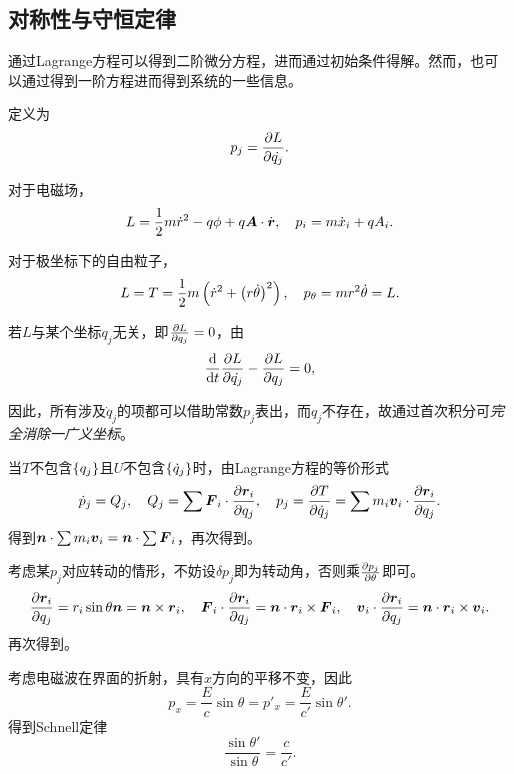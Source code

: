 \documentclass{ctexrep}
\begin{document}
\subsection{对称性与守恒定律}
通过Lagrange方程可以得到二阶微分方程，进而通过初始条件得解。然而，也可以通过得到一阶方程进而得到系统的一些信息。
\par
定义为
\[ p_j = \frac{\partial L}{\partial \dot{q_j}}. \]
\begin{ex}
  对于电磁场，
  \[ L = \frac{1}{2} m\dot{r}^2 - q\phi +q\boldsymbol{A}\cdot\dot{\boldsymbol{r}}, \quad p_i = m \dot{x}_i + q A_i. \]
\end{ex}
\begin{ex}
  对于极坐标下的自由粒子，
  \[ L = T = \frac{1}{2} m \left(\dot{r}^2 + \left(r\dot{\theta}\right)^2\right), \quad p_\theta = mr^2\dot{\theta} = L. \]
\end{ex}
若$L$与某个坐标$q_j$无关，即$\frac{\partial L}{\partial q_j}=0$，由
\[ \frac{\mathrm{d}}{\mathrm{d} t}\frac{\partial L}{\partial \dot{q_j}} - \frac{\partial L}{\partial q_j} = 0, \]
\par
因此，所有涉及$\dot{q}_j$的项都可以借助常数$p_j$表出，而$q_j$不存在，故通过首次积分可\emph{完全消除一广义坐标}。
\par
当$T$不包含$\left\{q_j\right\}$且$U$不包含$\left\{\dot{q}_j\right\}$时，由Lagrange方程的等价形式
\[ \dot{p}_j = Q_j, \quad Q_j = \sum\boldsymbol{F}_i \cdot\frac{\partial \boldsymbol{r}_i}{\partial q_j}, \quad p_j = \frac{\partial T}{\partial \dot{q}_j}=\sum m_i\boldsymbol{v}_i\cdot\frac{\partial \boldsymbol{r}_i}{\partial q_j}. \]
得到$\boldsymbol{n}\cdot\sum m_i\boldsymbol{v}_i =  \boldsymbol{n}\cdot\sum\boldsymbol{F}_i$，再次得到。
\par
考虑某$p_j$对应转动的情形，不妨设$\delta p_j$即为转动角，否则乘$\frac{\partial p_j}{\partial \theta}$即可。
\[ \frac{\partial \boldsymbol{r}_i}{\partial q_j} = r_i \sin\theta \boldsymbol{n} = \boldsymbol{n} \times \boldsymbol{r}_i, \quad \boldsymbol{F}_i\cdot\frac{\partial \boldsymbol{r}_i}{\partial q_j} = \boldsymbol{n}\cdot \boldsymbol{r}_i\times\boldsymbol{F}_i, \quad \boldsymbol{v}_i\cdot\frac{\partial \boldsymbol{r}_i}{\partial q_j} = \boldsymbol{n}\cdot \boldsymbol{r}_i\times\boldsymbol{v}_i. \]
再次得到。
\begin{ex}
  考虑电磁波在界面的折射，具有$x$方向的平移不变，因此
  \[ p_x = \frac{E}{c}\sin\theta = p'_x = \frac{E}{c'}\sin\theta'. \]
  得到Schnell定律
  \[ \frac{\sin\theta'}{\sin\theta} = \frac{c}{c'}. \]
\end{ex}
\end{document}
